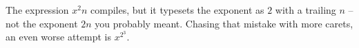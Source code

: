 \documentclass{article}
\begin{document}
The expression $x^2n$ compiles, but it typesets the exponent as $2$
with a trailing $n$ -- not the exponent $2n$ you probably meant.
Chasing that mistake with more carets, an even worse attempt is
$x^{2^3}$.
\end{document}
